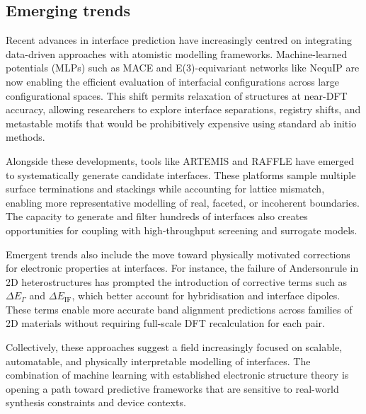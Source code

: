 \subsection{Emerging trends}

Recent advances in interface prediction have increasingly centred on integrating data-driven approaches with atomistic
modelling frameworks. Machine-learned potentials (MLPs) such as MACE and E(3)-equivariant networks like NequIP are now
enabling the efficient evaluation of interfacial configurations across large configurational spaces. This shift permits
relaxation of structures at near-DFT accuracy, allowing researchers to explore interface separations, registry shifts,
and metastable motifs that would be prohibitively expensive using standard ab initio methods.

Alongside these developments, tools like ARTEMIS and RAFFLE have emerged to systematically generate candidate
interfaces. These platforms sample multiple surface terminations and stackings while accounting for lattice mismatch,
enabling more representative modelling of real, faceted, or incoherent boundaries. The capacity to generate and filter
hundreds of interfaces also creates opportunities for coupling with high-throughput screening and surrogate models.

Emergent trends also include the move toward physically motivated corrections for electronic properties at interfaces.
For instance, the failure of Anderson\rqss rule in 2D heterostructures has prompted the introduction of corrective terms
such as $\Delta E_\Gamma$ and $\Delta E_\mathrm{IF}$, which better account for hybridisation and interface dipoles. These terms enable
more accurate band alignment predictions across families of 2D materials without requiring full-scale DFT recalculation
for each pair.

Collectively, these approaches suggest a field increasingly focused on scalable, automatable, and physically
interpretable modelling of interfaces. The combination of machine learning with established electronic structure theory
is opening a path toward predictive frameworks that are sensitive to real-world synthesis constraints and device
contexts.
